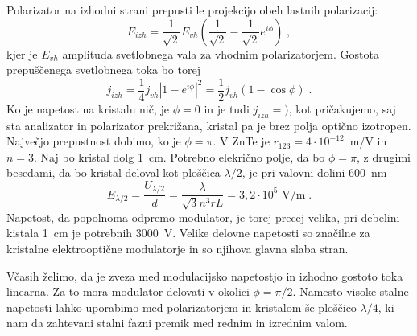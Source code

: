 Polarizator na izhodni strani prepusti le projekcijo obeh lastnih
polarizacij: 
\begin{equation}
E_{izh}=\frac{1}{\sqrt{2}}E_{vh}(\frac{1}{\sqrt{2}}-\frac{1}{\sqrt{2}}e^{i\phi})\;,\label{7.16}
\end{equation}
 kjer je $E_{vh}$ amplituda svetlobnega vala za vhodnim polarizatorjem.
Gostota prepuščenega svetlobnega toka bo torej 
\begin{equation}
j_{izh}=\frac{1}{4}j_{vh}|1-e^{i\phi}|^{2}=\frac{1}{2}j_{vh}(1-\cos\phi)\;.\label{7.17}
\end{equation}
 Ko je napetost na kristalu nič, je $\phi=0$ in je tudi $j_{izh}=)$,
kot pričakujemo, saj sta analizator in polarizator prekrižana, kristal
pa je brez polja optično izotropen. Največjo prepustnost dobimo, ko
je $\phi=\pi$. V ZnTe je $r_{123}=4\cdot10^{-12}$~m/V in $n=3$.
Naj bo kristal dolg 1~cm. Potrebno elekrično polje, da bo $\phi=\pi$,
z drugimi besedami, da bo kristal deloval kot ploščica $\lambda/2$,
je pri valovni dol\textquotedbl{}ini 600~nm 
\begin{equation}
E_{\lambda/2}=\frac{U_{\lambda/2}}{d}=\frac{\lambda}{\sqrt{3}n^{3}rL}=3,2\cdot10^{5}\mbox{ V/m}\;.\label{7.18}
\end{equation}
 Napetost, da popolnoma odpremo modulator, je torej precej velika,
pri debelini kistala 1~cm je potrebnih 3000~V. Velike delovne napetosti
so značilne za kristalne elektrooptične modulatorje in so njihova
glavna slaba stran.

Včasih želimo, da je zveza med modulacijsko napetostjo in izhodno
gostoto toka linearna. Za to mora modulator delovati v okolici $\phi=\pi/2$.
Namesto visoke stalne napetosti lahko uporabimo med polarizatorjem
in kristalom še ploščico $\lambda/4$, ki nam da zahtevani stalni
fazni premik med rednim in izrednim valom.

